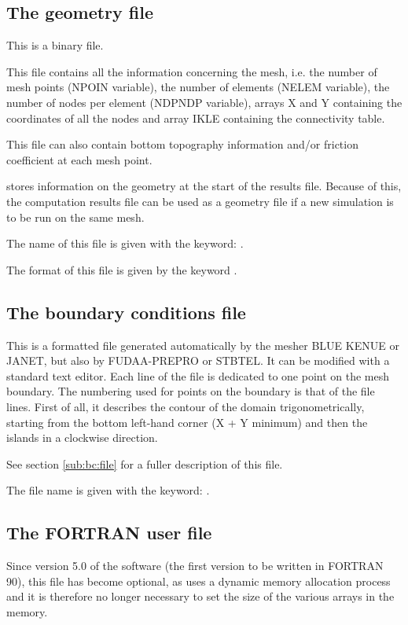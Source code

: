 \subsection{ The geometry file}

 This is a binary file.

 This file contains all the information concerning the mesh, i.e. the number of mesh points (NPOIN variable), the number of elements (NELEM variable), the number of nodes per element (NDPNDP variable), arrays X and Y containing the coordinates of all the nodes and array IKLE containing the connectivity table.

 This file can also contain bottom topography information and/or friction coefficient at each mesh point.

  stores information on the geometry at the start of the results file. Because of this, the computation results file can be used as a geometry file if a new simulation is to be run on the same mesh.

 The name of this file is given with the keyword: .

 The format of this file is given by the keyword .


\subsection{  The boundary conditions file}

 This is a formatted file generated automatically by the mesher BLUE KENUE or JANET, but also by FUDAA-PREPRO or STBTEL. It can be modified with a standard text editor. Each line of the file is dedicated to one point on the mesh boundary. The numbering used for points on the boundary is that of the file lines. First of all, it describes the contour of the domain trigonometrically, starting from the bottom left-hand corner (X + Y minimum) and then the islands in a clockwise direction.

 See section \ref{sub:bc:file} for a fuller description of this file.

 The file name is given with the keyword: .


\subsection{ The FORTRAN user file}
\label{subs:FORT:user:file}
 Since version 5.0 of the software (the first version to be written in FORTRAN 90), this file has become optional, as  uses a dynamic memory allocation process and it is therefore no longer necessary to set the size of the various arrays in the memory.

